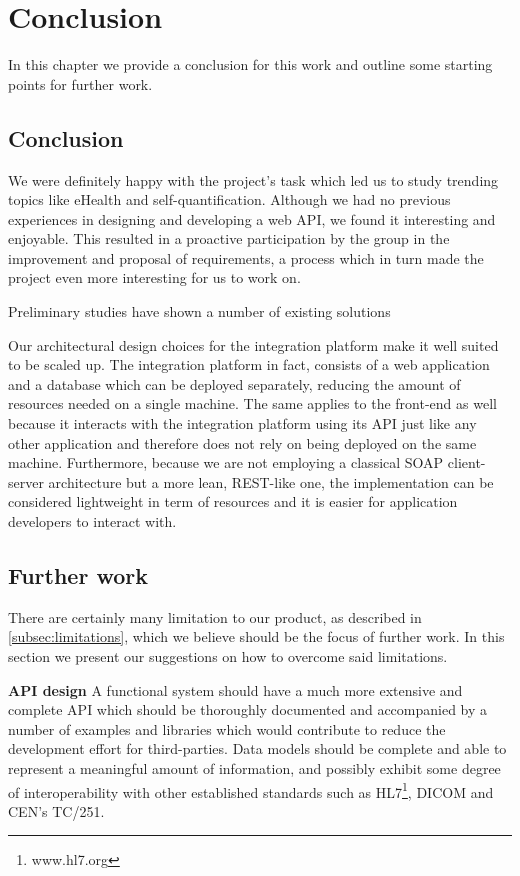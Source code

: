 \chapter{Conclusion}
\label{ch:conclusion}

In this chapter we provide a conclusion for this work and outline some
starting points for further work.

\section{Conclusion}

We were definitely happy with the project's task which led us to study trending topics
like eHealth and self-quantification. Although we had no previous experiences in designing and developing a web API,
we found it interesting and enjoyable. This resulted in a proactive participation by the group
in the improvement and proposal of requirements, a process which in turn made the project even more interesting
for us to work on.

Preliminary studies have shown a number of existing solutions



Our architectural design choices for the integration platform make it well suited to be scaled up.
The integration platform in fact, consists of a web application and a database which can be deployed separately,
reducing the amount of resources needed on a single machine.
The same applies to the front-end as well because it interacts with the integration platform using its API just like
any other application and therefore does not rely on being deployed on the same machine.
Furthermore, because we are not employing a classical SOAP client-server architecture but a more lean, REST-like one,
the implementation can be considered lightweight in term of resources and it is easier for application developers to interact with.

\section{Further work}

There are certainly many limitation to our product, as described in \ref{subsec:limitations}, which we believe should be
the focus of further work. In this section we present our suggestions on how to overcome said limitations.

\textbf{API design}
A functional system should have a much more extensive and complete API which should be
thoroughly documented and accompanied by a number of examples and libraries which
would contribute to reduce the development effort for third-parties.
Data models should be complete and able to represent a meaningful amount of information,
and possibly exhibit some degree of interoperability with other established standards
such as HL7\footnote{www.hl7.org}, DICOM and CEN's TC/251.

